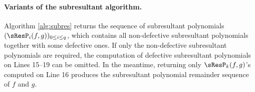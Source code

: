 \paragraph{Variants of the subresultant algorithm.}

Algorithm \ref{alg:subres} returns the sequence of subresultant polynomials $(\sResP_i(f,g))_{0\leq i\leq q}$, which contains all non-defective subresultant polynomials together with some defective ones. If only the non-defective subresultant polynomials are required, the computation of defective subresultant polynomials on Lines 15–19 can be omitted. In the meantime, returning only $\sResP_k(f,g)$'s computed on Line 16 produces the subresultant polynomial remainder sequence of $f$ and $g$.
